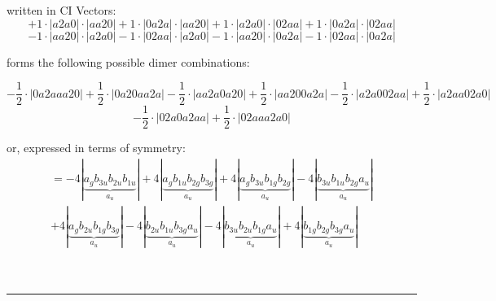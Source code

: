 \documentclass{article}
\begin{document}
\begin{minipage}{\linewidth}
written in CI Vectors: 
 $$+ 1 \cdot \left|a2a0 \right| \cdot \left| aa20 \right| 
+ 1 \cdot \left|0a2a \right| \cdot \left| aa20 \right| 
+ 1 \cdot \left|a2a0 \right| \cdot \left| 02aa \right| 
+ 1 \cdot \left|0a2a \right| \cdot \left| 02aa \right| 
 $$ $$ - 1 \cdot \left|aa20 \right| \cdot \left| a2a0 \right| 
- 1 \cdot \left|02aa \right| \cdot \left| a2a0 \right| 
- 1 \cdot \left|aa20 \right| \cdot \left| 0a2a \right| 
- 1 \cdot \left|02aa \right| \cdot \left| 0a2a \right| 
$$



 forms the following possible dimer combinations:

$$- \frac{1}{2} \cdot \left|0a2aaa20 \right| + \frac{1}{2} \cdot \left|0a20aa2a \right| - \frac{1}{2} \cdot \left|aa2a0a20 \right| + \frac{1}{2} \cdot \left|aa200a2a \right| - \frac{1}{2} \cdot \left|a2a002aa \right| + \frac{1}{2} \cdot \left|a2aa02a0 \right|  $$ $$ - \frac{1}{2} \cdot \left|02a0a2aa \right| + \frac{1}{2} \cdot \left|02aaa2a0 \right| $$



\end{minipage}
\vspace{0.5cm}


or, expressed in terms of symmetry:\begin{multline*}
=-4\left|\underbrace{a_{g} b_{3u} b_{2u} b_{1u}}_{a_{u}}\right|+4\left|\underbrace{a_{g} b_{1u} b_{2g} b_{3g}}_{a_{u}}\right|+4\left|\underbrace{a_{g} b_{3u} b_{1g} b_{2g}}_{a_{u}}\right|-4\left|\underbrace{b_{3u} b_{1u} b_{2g} a_{u}}_{a_{u}}\right|\\
+4\left|\underbrace{a_{g} b_{2u} b_{1g} b_{3g}}_{a_{u}}\right|-4\left|\underbrace{b_{2u} b_{1u} b_{3g} a_{u}}_{a_{u}}\right|-4\left|\underbrace{b_{3u} b_{2u} b_{1g} a_{u}}_{a_{u}}\right|+4\left|\underbrace{b_{1g} b_{2g} b_{3g} a_{u}}_{a_{u}}\right|
\end{multline*}\\\\

 


\hrule
\vspace{0.5cm}
\end{document}
